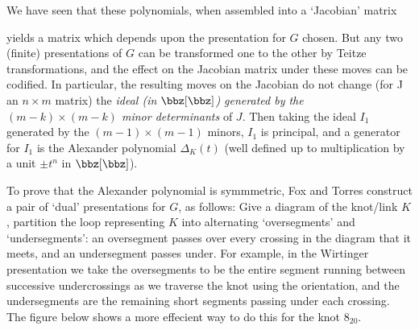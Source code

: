 \ssk

We have seen that these polynomials, when assembled into a `Jacobian' matrix

\ssk


\ssk

yields a matrix which depends 
upon the presentation for $G$ chosen. But any two (finite) presentations of $G$ can
be transformed one to the other by Teitze transformations, and the effect on 
the Jacobian matrix under these moves can be codified. In particular, the 
resulting moves on the Jacobian do not change (for J an $n\times m$ matrix)
the {\it ideal (in $\bbz[\bbz]$) generated by the 
$(m-k)\times(m-k)$ minor determinants} of $J$. Then taking the
ideal $I_1$ generated by the $(m-1)\times(m-1)$ minors, $I_1$ is principal,
and a generator for $I_1$ is the Alexander polynomial $\Delta_K(t)$ (well defined up
to multiplication by a unit $\pm t^n$ in $\bbz[\bbz]$).

\msk

To prove that the Alexander polynomial is symmmetric, Fox and Torres construct
a pair of `dual' presentations for $G$, as follows: Give a diagram of 
the knot/link $K$, partition the loop representing $K$ into alternating
`oversegments' and `undersegments': an oversegment passes over every crossing
in the diagram that it meets, and an undersegment passes under. For example,
in the Wirtinger presentation we take the oversegments to be the entire
segment running between successive undercrossings as we traverse the knot
using the orientation, and the undersegments are the remaining short segments
passing under each crossing. The figure below shows a more effecient way to 
do this for the knot $8_{20}$. 


\leavevmode

\epsfxsize=4in

\msk

